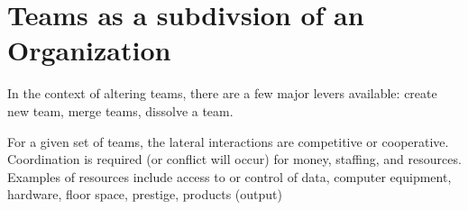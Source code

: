

\section{Teams as a subdivsion of an Organization}

In the context of altering teams, there are a few major levers available: create new team, merge teams, dissolve a team. 

For a given set of teams, the lateral interactions are competitive or cooperative. Coordination is required (or conflict will occur) for money, staffing, and resources. Examples of resources include access to or control of data, computer equipment, hardware, floor space, prestige, products (output)
